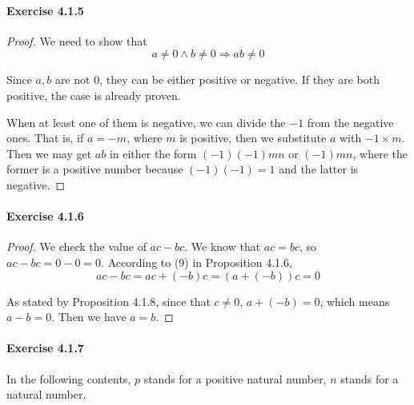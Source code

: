 \paragraph{Exercise 4.1.5} \label{exercise4.1.5}
\begin{proof}
We need to show that 
\[
a \neq 0 \wedge b \neq 0 \Longrightarrow ab \neq 0
\]

Since $a,b$ are not 0, they can be either positive or negative. If they are both positive, the case is 
already proven.

When at least one of them is negative, we can divide the $-1$ from the negative ones. That is, if $a=-m$, 
where $m$ is positive, then we substitute $a$ with $-1 \times m$. Then we may get $ab$ in either the form 
$(-1)(-1) mn$ or $(-1) mn$, where the former is a positive number because $(-1)(-1) =1$ and the latter is 
negative.
\end{proof}

\paragraph{Exercise 4.1.6} \label{exercise4.1.6}
\begin{proof}
We check the value of $ac-bc$. We know that $ac=bc$, so $ac - bc = 0 - 0 = 0$. According to (9) in 
Proposition 4.1.6, 
\[
ac - bc = ac+(-b)c = (a+(-b))c = 0
\]

As stated by Proposition 4.1.8, since that $c \neq 0$, $a+(-b) = 0$, which means $a-b=0$. Then we have 
$a=b$.
\end{proof}

\paragraph{Exercise 4.1.7} \label{exercise4.1.7}
In the following contents, $p$ stands for a positive natural number, $n$ stands for a natural number.

